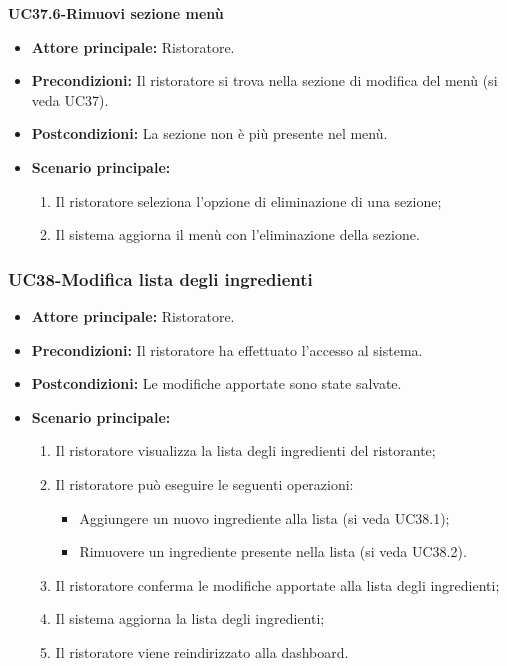 \textbf{UC37.6-Rimuovi sezione menù}
\begin{itemize}
    \item \textbf{Attore principale:} Ristoratore.
    \item \textbf{Precondizioni:} Il ristoratore si trova nella sezione di modifica del menù (si veda UC37).
    \item \textbf{Postcondizioni:} La sezione non è più presente nel menù.
    \item \textbf{Scenario principale:}
    \begin{enumerate}
        \item Il ristoratore seleziona l'opzione di eliminazione di una sezione;
        \item Il sistema aggiorna il menù con l'eliminazione della sezione.
    \end{enumerate}
\end{itemize}

\subsubsection{UC38-Modifica lista degli ingredienti}
\begin{itemize}
    \item \textbf{Attore principale:} Ristoratore.
    \item \textbf{Precondizioni:} Il ristoratore ha effettuato l'accesso al sistema.
    \item \textbf{Postcondizioni:} Le modifiche apportate sono state salvate.
    \item \textbf{Scenario principale:}
    \begin{enumerate}
        \item Il ristoratore visualizza la lista degli ingredienti del ristorante;
        \item Il ristoratore può eseguire le seguenti operazioni:
        \begin{itemize}
           \item Aggiungere un nuovo ingrediente alla lista (si veda UC38.1);
           \item Rimuovere un ingrediente presente nella lista (si veda UC38.2).
        \end{itemize}
    \item Il ristoratore conferma le modifiche apportate alla lista degli ingredienti;
    \item Il sistema aggiorna la lista degli ingredienti;
    \item Il ristoratore viene reindirizzato alla dashboard.
    \end{enumerate}
\end{itemize}

